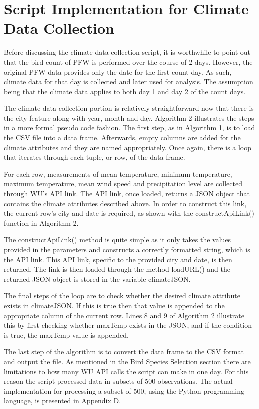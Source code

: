 \section{Script Implementation for Climate Data Collection}

Before discussing the climate data collection script, it is worthwhile to point out that the bird count of PFW is performed over the course of 2 days. However, the original PFW data provides only the date for the first count day. As such, climate data for that day is collected and later used for analysis. The assumption being that the climate data applies to both day 1 and day 2 of the count days.

The climate data collection portion is relatively straightforward now that there is the city feature along with year, month and day. Algorithm 2 illustrates the steps in a more formal pseudo code fashion. The first step, as in Algorithm 1, is to load the CSV file into a data frame. Afterwards, empty columns are added for the climate attributes and they are named appropriately. Once again, there is a loop that iterates through each tuple, or row, of the data frame. 

For each row, measurements of mean temperature, minimum temperature, maximum temperature, mean wind speed and precipitation level are collected through WU's API link. The API link, once loaded, returns a JSON object that contains the climate attributes described above. In order to construct this link, the current row's city and date is required, as shown with the constructApiLink() function in Algorithm 2.

The constructApiLink() method is quite simple as it only takes the values provided in the parameters and constructs a correctly formatted string, which is the API link. This API link, specific to the provided city and date, is then returned. The link is then loaded through the method loadURL() and the returned JSON object is stored in the variable climateJSON.

The final steps of the loop are to check whether the desired climate attribute exists in climateJSON. If this is true then that value is appended to the appropriate column of the current row. Lines 8 and 9 of Algorithm 2 illustrate this by first checking whether maxTemp exists in the JSON, and if the condition is true, the maxTemp value is appended. 

The last step of the algorithm is to convert the data frame to the CSV format and output the file. As mentioned in the Bird Species Selection section there are limitations to how many WU API calls the script can make in one day. For this reason the script processed data in subsets of 500 observations. The actual implementation for processing a subset of 500, using the Python programming language, is presented in Appendix D.  

